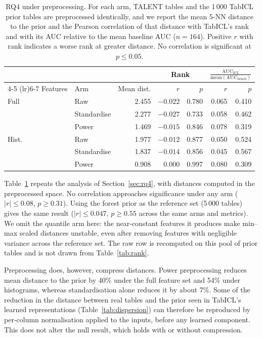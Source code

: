 \documentclass{article}
\begin{document}
\begin{table}[ht]
\centering
\caption{RQ4 under preprocessing. For each arm, TALENT tables and the 1\,000 TabICL prior tables are preprocessed identically, and we report the mean 5-NN distance to the prior and the Pearson correlation of that distance with TabICL's rank and with its AUC relative to the mean baseline AUC ($n = 164$). Positive $r$ with rank indicates a worse rank at greater distance. No correlation is significant at $p \leq 0.05$.}
\label{tab:preprocessing-rank}
\small
\begin{tabular}{ll r rr rr}
\toprule
 & & & \multicolumn{2}{c}{Rank} & \multicolumn{2}{c}{$\frac{\textrm{AUC}_{\textrm{ICL}}}{\textrm{mean}(\textrm{AUC}_{\textrm{bench}})}$} \\
\cmidrule(lr){4-5} \cmidrule(lr){6-7}
Features & Arm & Mean dist. & $r$ & $p$ & $r$ & $p$ \\
\midrule
Full  & Raw         & 2.455 & $-0.022$ & 0.780 & 0.065 & 0.410 \\
      & Standardise & 2.277 & $-0.027$ & 0.733 & 0.058 & 0.462 \\
      & Power       & 1.469 & $-0.015$ & 0.846 & 0.078 & 0.319 \\
\midrule
Hist. & Raw         & 1.977 & $-0.012$ & 0.877 & 0.050 & 0.524 \\
      & Standardise & 1.837 & $-0.014$ & 0.856 & 0.045 & 0.567 \\
      & Power       & 0.908 & 0.000 & 0.997 & 0.080 & 0.309 \\
\bottomrule
\end{tabular}
\end{table}

Table~\ref{tab:preprocessing-rank} repeats the analysis of Section~\ref{sec:rq4}, with distances computed in the preprocessed space.
No correlation approaches significance under any arm ($|r| \leq 0.08$, $p \geq 0.31$).
Using the forest prior as the reference set (5\,000 tables) gives the same result ($|r| \leq 0.047$, $p \geq 0.55$ across the same arms and metrics).
We omit the quantile arm here: the near-constant features it produces make min--max scaled distances unstable, even after removing features with negligible variance across the reference set.
The raw row is recomputed on this pool of prior tables and is not drawn from Table~\ref{tab:rank}.

Preprocessing does, however, compress distances.
Power preprocessing reduces mean distance to the prior by 40\% under the full feature set and 54\% under histograms, whereas standardisation alone reduces it by about 7\%.
Some of the reduction in the distance between real tables and the prior seen in TabICL's learned representations (Table~\ref{tab:dispersion}) can therefore be reproduced by per-column normalisation applied to the inputs, before any learned component.
This does not alter the null result, which holds with or without compression.
\end{document}
